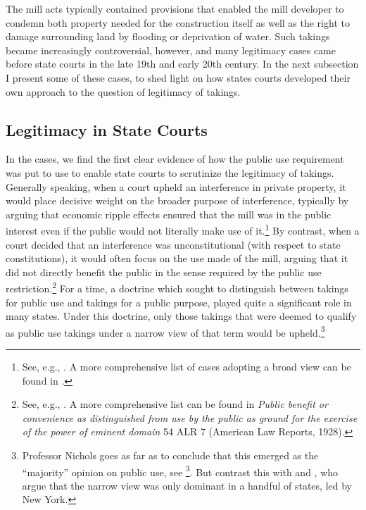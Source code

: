The mill acts typically contained provisions that enabled the mill developer to condemn both property needed for the construction itself as well as the right to damage surrounding land by flooding or deprivation of water. Such takings became increasingly controversial, however, and many legitimacy cases came before state courts in the late 19th and early 20th century. In the next subsection I present some of these cases, to shed light on how states courts developed their own approach to the question of legitimacy of takings.

\subsection{Legitimacy in State Courts}\label{subsec:state}

In the  cases, we find the first clear evidence of how the public use requirement was put to use to enable state courts to scrutinize the legitimacy of takings. Generally speaking, when a court upheld an interference in private property, it would place decisive weight on the broader purpose of interference, typically by arguing that economic ripple effects ensured that the mill was in the public interest even if the public would not literally make use of it.\footnote{See, e.g., \cite{hazen53,scudder32,boston32}. A more comprehensive list of cases adopting a broad view can be found in \cite[617]{nichols40}.} By contrast, when a court decided that an interference was unconstitutional (with respect to state constitutions), it would often focus on the use made of the mill, arguing that it did not directly benefit the public in the sense required by the public use restriction.\footnote{See, e.g., \cite{sadler59,ryerson77,gaylord03,minn06}. A more comprehensive list can be found in {\it Public benefit or convenience as distinguished from use by the public as ground for the exercise of the power of eminent domain} 54 ALR 7 (American Law Reports, 1928).} For a time, a doctrine which sought to distinguish between takings for public use and takings for a public purpose, played quite a significant role in many states. Under this doctrine, only those takings that were deemed to qualify as public use takings under a narrow view of that term would be upheld.\footnote{Professor Nichols goes as far as to conclude that this emerged as the ``majority'' opinion on public use, see \footcite[617-618]{nichols40}. But contrast this with \cite{berger78} and \cite[24]{meidinger80}, who argue that the narrow view was only dominant in a handful of states, led by New York.}

